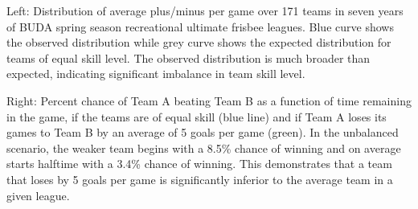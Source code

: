 Left: Distribution of average plus/minus per game over 171 teams in seven years of BUDA spring season recreational ultimate frisbee leagues.  Blue curve shows the observed distribution while grey curve shows the expected distribution for teams of equal skill level. The observed distribution is much broader than expected, indicating significant imbalance in team skill level. 

Right: Percent chance of Team A beating Team B as a function of time remaining in the game, if the teams are of equal skill (blue line) and if Team A loses its games to Team B by an average of 5 goals per game (green). In the unbalanced scenario, the weaker team begins with a 8.5\% chance of winning and on average starts halftime with a 3.4\% chance of winning. This demonstrates that a team that loses by 5 goals per game is significantly inferior to the average team in a given league. \label{fig:buda_performance}